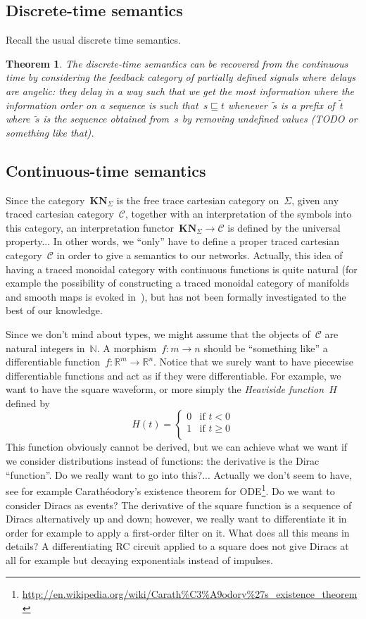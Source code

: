 \documentclass{article}
\newtheorem{theorem}{Theorem}
\newcommand{\N}{\mathbb{N}}
\newcommand{\R}{\mathbb{R}}
\newcommand{\category}[1]{\mathbf{#1}}
\newcommand{\KN}{\category{KN}}
\renewcommand{\C}{\mathcal{C}}
\begin{document}
\subsection{Discrete-time semantics}
Recall the usual discrete time semantics.

\begin{theorem}
  The discrete-time semantics can be recovered from the continuous time by
  considering the feedback category of partially defined signals where delays
  are angelic: they delay in a way such that we get the most information where
  the information order on a sequence is such that~$s\sqsubseteq t$
  whenever~$\tilde{s}$ is a prefix of~$\tilde{t}$ where~$\tilde{s}$ is the
  sequence obtained from~$s$ by removing undefined values (TODO or something
  like that).
\end{theorem}

\subsection{Continuous-time semantics}
Since the category~$\KN_\Sigma$ is the free trace cartesian category
on~$\Sigma$, given any traced cartesian category~$\C$, together with an
interpretation of the symbols into this category, an interpretation
functor~$\KN_\Sigma\to\C$ is defined by the universal property... In other
words, we ``only'' have to define a proper traced cartesian category~$\C$ in
order to give a semantics to our networks. Actually, this idea of having a
traced monoidal category with continuous functions is quite natural (for example
the possibility of constructing a traced monoidal category of manifolds and
smooth maps is evoked in~\cite{abramsky1996retracing}), but has not been
formally investigated to the best of our knowledge.

Since we don't mind about types, we might assume that the objects of~$\C$ are
natural integers in~$\N$. A morphism~$f:m\to n$ should be ``something like'' a
differentiable function~$f:\R^m\to\R^n$. Notice that we surely want to have
piecewise differentiable functions and act as if they were differentiable. For
example, we want to have the square waveform, or more simply the \emph{Heaviside
  function}~$H$ defined by
\[
H(t)=
\begin{cases}
  0&\text{if $t<0$}\\
  1&\text{if $t\geq 0$}\\
\end{cases}
\]
This function obviously cannot be derived, but we can achieve what we want if we
consider distributions instead of functions: the derivative is the Dirac
``function''. Do we really want to go into this?... Actually we don't seem to
have, see for example Carathéodory's existence theorem for
ODE\footnote{\url{http://en.wikipedia.org/wiki/Carath\%C3\%A9odory\%27s_existence_theorem}}.
Do we want to consider Diracs as events? The derivative of the square function
is a sequence of Diracs alternatively up and down; however, we really want to
differentiate it in order for example to apply a first-order filter on it. What
does all this means in details? A differentiating RC circuit applied to a square
does not give Diracs at all for example but decaying exponentials instead of
impulses.
\end{document}
